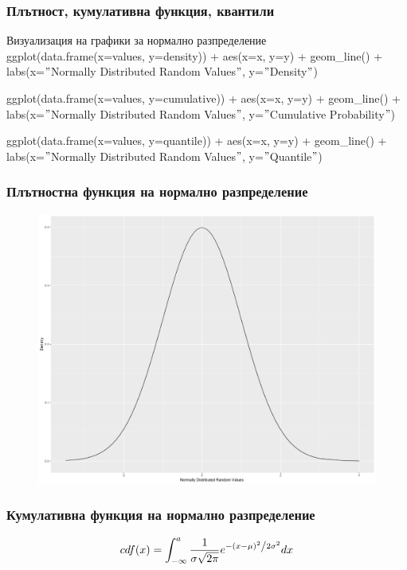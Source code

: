 \documentclass{beamer}
\begin{document}
\begin{frame}
\frametitle{Плътност, кумулативна функция, квантили}
\begin{block}{Визуализация на графики за нормално разпределение}
ggplot(data.frame(x=values, y=density)) + aes(x=x, y=y) + geom\_line() + labs(x=$"$Normally Distributed Random Values$"$, y=$"$Density$"$)

ggplot(data.frame(x=values, y=cumulative)) + aes(x=x, y=y) + geom\_line() + labs(x=$"$Normally Distributed Random Values$"$, y=$"$Cumulative Probability$"$)

ggplot(data.frame(x=values, y=quantile)) + aes(x=x, y=y) + geom\_line() + labs(x=$"$Normally Distributed Random Values$"$, y=$"$Quantile$"$)
\end{block}
\end{frame}

\begin{frame}
\frametitle{Плътностна функция на нормално разпределение}
\begin{figure}[]\includegraphics[width=\textwidth,height=0.75\textheight]{pic0051}\end{figure}
\end{frame}

\begin{frame}
\frametitle{Кумулативна функция на нормално разпределение}
\begin{equation}
cdf(x) = \int_{-\infty}^{a} \frac{1}{{\sigma \sqrt {2\pi } }}e^{{{ - \left( {x - \mu } \right)^2 } \mathord{\left/ {\vphantom {{ - \left( {x - \mu } \right)^2 } {2\sigma ^2 }}} \right. \kern-\nulldelimiterspace} {2\sigma ^2 }}} dx
\end{equation}
\end{frame}
\end{document}

